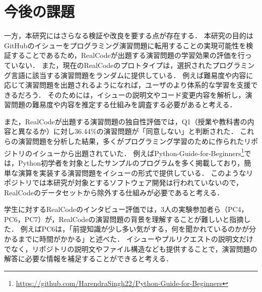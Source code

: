 

\section{今後の課題}


一方，本研究にはさらなる検証や改良を要する点が存在する．
本研究の目的はGitHubのイシューをプログラミング演習問題に転用することの実現可能性を検証することであるため，RealCodeが出題する演習問題の学習効果の評価を行っていない．
また，現在のRealCodeのプロトタイプは，選択されたプログラミング言語に該当する演習問題をランダムに提供している．
例えば難易度や内容に応じて演習問題を出題されるようになれば，ユーザのより体系的な学習を支援できるだろう．
そのためには，イシューの説明文やコード変更内容を解析し，演習問題の難易度や内容を推定する仕組みを調査する必要があると考える．

また，RealCodeが出題する演習問題の独自性評価では，Q1（授業や教科書の内容と異なるか）に対し36.44\%の演習問題が「同意しない」と判断された．
これらの演習問題を分析した結果，多くがプログラミング学習のために作られたリポジトリのイシューから出題されていた．
例えばPython-Guide-for-Beginners\footnote{\url{https://github.com/HarendraSingh22/Python-Guide-for-Beginners}}では，Python初学者を対象としたサンプルのプログラムを多く掲載しており，簡単な演算を実装する演習問題をイシューの形式で提供している．
このようなリポジトリでは本研究が対象とするソフトウェア開発は行われていないので，RealCodeのデータセットから除外する仕組みが必要であると考える．

学生に対するRealCodeのインタビュー評価では，3人の実験参加者ら（PC4，PC6，PC7）が，RealCodeの演習問題の背景を理解することが難しいと指摘した．
例えばPC6は，「前提知識が少し多い気がする，何を聞かれているのかが分かるまでに時間がかかる」と述べた．
イシューやプルリクエストの説明文だけでなく，リポジトリの説明文やファイル構造なども提供することで，演習問題の解答に必要な情報を補足することができると考える．




